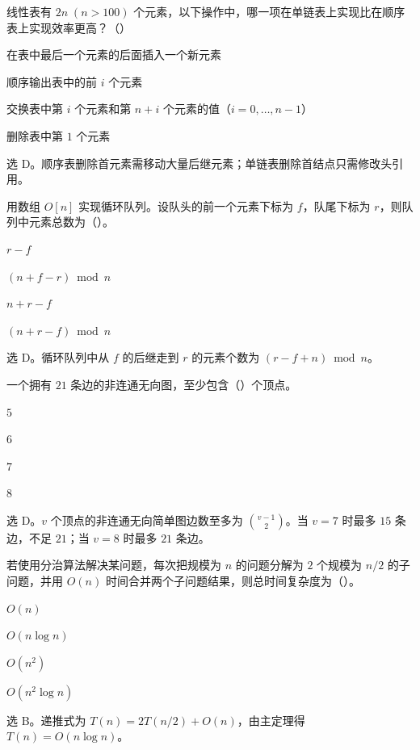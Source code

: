 \begin{question}
线性表有 $2n\;(n>100)$ 个元素，以下操作中，哪一项在单链表上实现比在顺序表上实现效率更高？（\quad）
\begin{choiceoptions}[2]
  \item 在表中最后一个元素的后面插入一个新元素
  \item 顺序输出表中的前 $i$ 个元素
  \item 交换表中第 $i$ 个元素和第 $n+i$ 个元素的值（$i=0,\ldots,n-1$）
  \item 删除表中第 $1$ 个元素
\end{choiceoptions}
\begin{solution}
选 D。顺序表删除首元素需移动大量后继元素；单链表删除首结点只需修改头引用。
\end{solution}
\end{question}

\begin{question}
用数组 $O[n]$ 实现循环队列。设队头的前一个元素下标为 $f$，队尾下标为 $r$，则队列中元素总数为（\quad）。
\begin{choiceoptions}[2]
  \item $r-f$
  \item $(n+f-r)\bmod n$
  \item $n+r-f$
  \item $(n+r-f)\bmod n$
\end{choiceoptions}
\begin{solution}
选 D。循环队列中从 $f$ 的后继走到 $r$ 的元素个数为 $(r-f+n)\bmod n$。
\end{solution}
\end{question}

\begin{question}
一个拥有 $21$ 条边的非连通无向图，至少包含（\quad）个顶点。
\begin{choiceoptions}[2]
  \item $5$
  \item $6$
  \item $7$
  \item $8$
\end{choiceoptions}
\begin{solution}
选 D。$v$ 个顶点的非连通无向简单图边数至多为 $\binom{v-1}{2}$。当 $v=7$ 时最多 $15$ 条边，不足 $21$；当 $v=8$ 时最多 $21$ 条边。
\end{solution}
\end{question}

\begin{question}
若使用分治算法解决某问题，每次把规模为 $n$ 的问题分解为 $2$ 个规模为 $n/2$ 的子问题，并用 $O(n)$ 时间合并两个子问题结果，则总时间复杂度为（\quad）。
\begin{choiceoptions}[1]
  \item $O(n)$
  \item $O(n\log n)$
  \item $O(n^2)$
  \item $O(n^2\log n)$
\end{choiceoptions}
\begin{solution}
选 B。递推式为 $T(n)=2T(n/2)+O(n)$，由主定理得 $T(n)=O(n\log n)$。
\end{solution}
\end{question}

